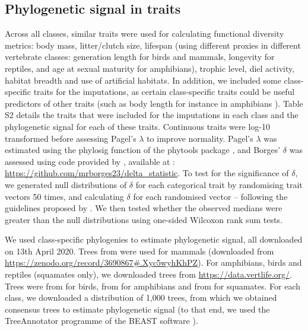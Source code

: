 \subsection{Phylogenetic signal in traits}
Across all classes, similar traits were used for calculating functional diversity metrics: body mass, litter/clutch size, lifespan (using different proxies in different vertebrate classes: generation length for birds and mammals, longevity for reptiles, and age at sexual maturity for amphibians), trophic level, diel activity, habitat breadth and use of artificial habitats. In addition, we included some class-specific traits for the imputations, as certain class-specific traits could be useful predictors of other traits (such as body length for instance in amphibians \citep{Santini2018}). Table S2 details the traits that were included for the imputations in each class and the phylogenetic signal for each of these traits. Continuous traits were log-10 transformed before assessing Pagel’s $\lambda$ to improve normality. Pagel’s $\lambda$ was estimated using the phylosig function of the phytools package \citep{Revell2016}, and Borges’ $\delta$ was assessed using code provided by \citet{Borges2018}, available at : \url{https://github.com/mrborges23/delta_statistic}. To test for the significance of $\delta$, we generated null distributions of $\delta$ for each categorical trait by randomising trait vectors 50 times, and calculating $\delta$ for each randomised vector – following the guidelines proposed by \citet{Borges2018}. We then tested whether the observed medians were greater than the null distributions using one-sided Wilcoxon rank sum tests.

We used class-specific phylogenies to estimate phylogenetic signal, all downloaded on 13th April 2020. Trees from \citet{Faurby2018, Faurby2020}  were used for mammals (downloaded from \url{https://zenodo.org/record/3690867#.Xyc5wyhKhPZ}). For amphibians, birds and reptiles (squamates only), we downloaded trees from \url{https://data.vertlife.org/}. Trees were from \citet{Jetz2012} for birds, from \citet{Jetz2018} for amphibians and from \citet{Tonini2016} for squamates. For each class, we downloaded a distribution of 1,000 trees, from which we obtained consensus trees to estimate phylogenetic signal (to that end, we used the TreeAnnotator programme of the BEAST software \citep{Bouckaert2014}).


